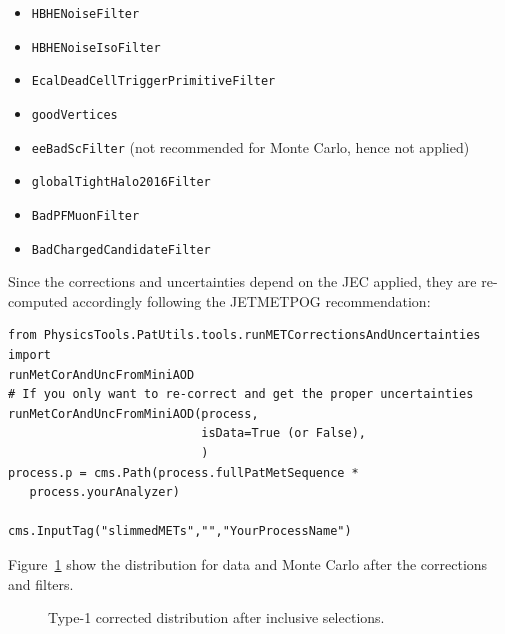 \begin{itemize}
  \item {\tt HBHENoiseFilter}
  \item {\tt HBHENoiseIsoFilter}
  \item {\tt EcalDeadCellTriggerPrimitiveFilter}
  \item {\tt goodVertices}
  \item {\tt eeBadScFilter} (not recommended for Monte Carlo, hence not applied)
  \item {\tt globalTightHalo2016Filter}
    \item {\tt BadPFMuonFilter}
    \item {\tt BadChargedCandidateFilter}
\end{itemize}

Since the \MET corrections and uncertainties depend on the JEC applied, they are re-computed accordingly following the JETMETPOG recommendation:
\begin{verbatim}
from PhysicsTools.PatUtils.tools.runMETCorrectionsAndUncertainties import
runMetCorAndUncFromMiniAOD
# If you only want to re-correct and get the proper uncertainties
runMetCorAndUncFromMiniAOD(process,
                           isData=True (or False),
                           )
process.p = cms.Path(process.fullPatMetSequence *
   process.yourAnalyzer)

cms.InputTag("slimmedMETs","","YourProcessName")
\end{verbatim}

Figure~\ref{fig:type1_met} show the \MET distribution for data and Monte Carlo after the corrections and filters.
 
 \begin{figure}[!htb]
   \centering
   
   \caption{Type-1 corrected \MET distribution after inclusive selections.}
   \label{fig:type1_met}
 \end{figure}


\clearpage

